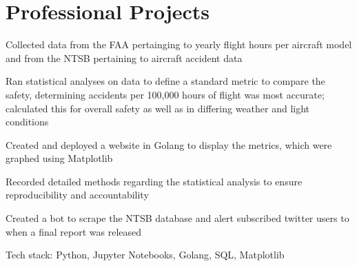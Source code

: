 \documentclass[letterpaper]{resume}
\begin{document}
\author{Sarah F. Majors}
\maketitle

%

\section{Professional Projects}
\begin{compactitem}
\item Collected data from the FAA pertainging to yearly flight hours per aircraft model and from the NTSB pertaining to aircraft accident data
\item Ran statistical analyses on data to define a standard metric to compare the safety, determining accidents per 100,000 hours of flight was most accurate; calculated this for overall safety as well as in differing weather and light conditions
\item Created and deployed a website in Golang to display the metrics, which were graphed using Matplotlib
\item Recorded detailed methods regarding the statistical analysis to ensure reproducibility and accountability
\item Created a bot to scrape the NTSB database and alert subscribed twitter users to when a final report was released
\item Tech stack: Python, Jupyter Notebooks, Golang, SQL, Matplotlib
\end{compactitem}
\end{document}
